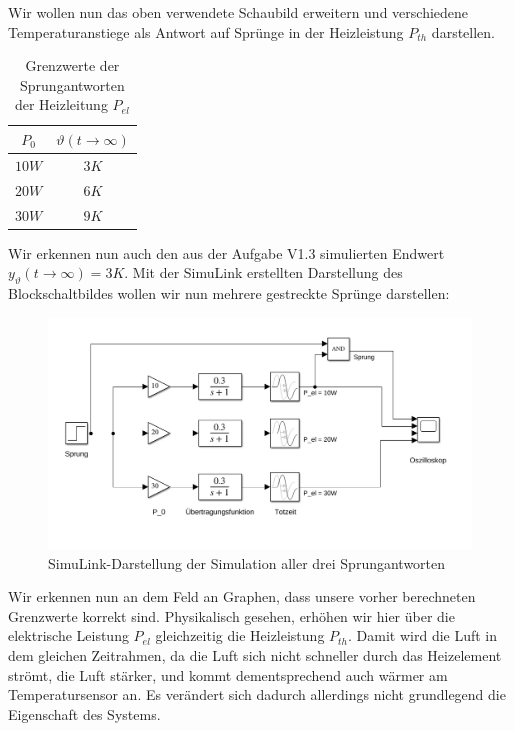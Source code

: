 \documentclass{report}
\begin{document}
Wir wollen nun das oben verwendete Schaubild erweitern und verschiedene Temperaturanstiege als Antwort auf Sprünge in der Heizleistung $P_{th}$ darstellen.
\begin{table}[h]
  \centering
  \begin{tabular}{|c|c|}
    \hline
    $P_{0}$ & $\vartheta(t \to \infty)$\\
    \hline
    $10W$ & $3K$ \\
    $20W$ & $6K$ \\
    $30W$ & $9K$ \\
    \hline
  \end{tabular}
  \caption{Grenzwerte der Sprungantworten der Heizleitung $P_{el}$}
  \label{tab:limpel}
\end{table}

Wir erkennen nun auch den aus der Aufgabe V1.3 simulierten Endwert $y_{\vartheta}(t\to\infty) = 3K$. Mit der SimuLink erstellten Darstellung des Blockschaltbildes wollen wir nun mehrere gestreckte Sprünge darstellen:

\begin{figure}[h]
  \centering
  \includegraphics[width=\textwidth]{../assets/images/RTP/rtp_1_V14.png}
  \caption{SimuLink-Darstellung der Simulation aller drei Sprungantworten}
  \label{fig:rtp1v14}
\end{figure}

\newpage

Wir erkennen nun an dem Feld an Graphen, dass unsere vorher berechneten Grenzwerte korrekt sind. Physikalisch gesehen, erhöhen wir hier über die elektrische Leistung $P_{el}$ gleichzeitig die Heizleistung $P_{th}$. Damit wird die Luft in dem gleichen Zeitrahmen, da die Luft sich nicht schneller durch das Heizelement strömt, die Luft stärker, und kommt dementsprechend auch wärmer am Temperatursensor an. Es verändert sich dadurch allerdings nicht grundlegend die Eigenschaft des Systems.
\end{document}
